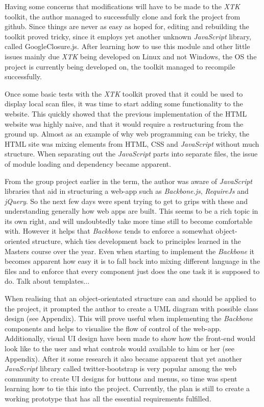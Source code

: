 \documentclass[a4paper,11pt,titlepage]{article}
\begin{document}
Having some concerns that modifications will have to be made to the \textit{XTK} toolkit, the author managed to successfully clone and fork the project from github. Since things are never as easy as hoped for, editing and rebuilding the toolkit proved tricky, since it employs yet another unknown \textit{JavaScript} library, called GoogleClosure.js. After learning how to use this module and other little issues mainly due \textit{XTK} being developed on Linux and not Windows, the OS the project is currently being developed on, the toolkit managed to recompile successfully.

Once some basic tests with the \textit{XTK} toolkit proved that it could be used to display local scan files, it was time to start adding some functionality to the website. This quickly showed that the previous implementation of the HTML website was highly naive, and that it would require a restructuring from the ground up. Almost as an example of why web programming can be tricky, the HTML site was mixing elements from HTML, CSS and \textit{JavaScript} without much structure. When separating out the \textit{JavaScript} parts into separate files, the issue of module loading and dependency became apparent.

From the group project earlier in the term, the author was aware of \textit{JavaScript} libraries that aid in structuring a web-app such as \textit{Backbone.js}, \textit{RequireJs} and \textit{jQuery}. So the next few days were spent trying to get to grips with these and understanding generally how web apps are built. This seems to be a rich topic in its own right, and will undoubtedly take more time still to become comfortable with. However it helps that \textit{Backbone} tends to enforce a somewhat object-oriented structure, which ties development back to principles learned in the Masters course over the year. Even when starting to implement the \textit{Backbone} it becomes apparent how easy it is to fall back into mixing different language in the files and to enforce that every component just does the one task it is supposed to do. Talk about templates...

When realising that an object-orientated structure can and should be applied to the project, it prompted the author to create a UML diagram with possible class design (see Appendix). This will prove useful when implementing the \textit{Backbone} components and helps to visualise the flow of control of the web-app. Additionally, visual UI design have been made to show how the front-end would look like to the user and what controls would available to him or her (see Appendix). After it some research it also became apparent that yet another \textit{JavaScript} library called twitter-bootstrap is very popular among the web community to create UI designs for buttons and menus, so time was spent learning how to tie this into the project.
Currently, the plan is still to create a working prototype that has all the essential requirements fulfilled.
\end{document}
